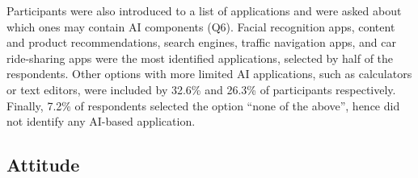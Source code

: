 \documentclass{article}
\begin{document}
Participants were also introduced to a list of applications and were asked about which ones may contain AI components (Q6). Facial recognition apps, content and product recommendations, search engines, traffic navigation apps, and car ride-sharing apps were the most identified applications, selected by half of the respondents. Other options with more limited AI applications, such as calculators or text editors, were included by 32.6\% and 26.3\% of participants respectively. Finally, 7.2\% of respondents selected the option ``none of the above'', hence did not identify any AI-based application.




\subsection{Attitude}
\end{document}

